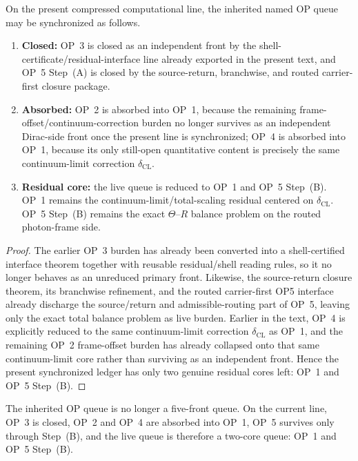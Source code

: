 \begin{proposition}
On the present compressed computational line, the inherited named OP queue may be synchronized as follows.
\begin{enumerate}[leftmargin=2em]
  \item \textbf{Closed:} OP~3 is closed as an independent front by the shell-certificate/residual-interface line already exported in the present text, and OP~5 Step~(A) is closed by the source-return, branchwise, and routed carrier-first closure package.
  \item \textbf{Absorbed:} OP~2 is absorbed into OP~1, because the remaining frame-offset/continuum-correction burden no longer survives as an independent Dirac-side front once the present line is synchronized; OP~4 is absorbed into OP~1, because its only still-open quantitative content is precisely the same continuum-limit correction \(\delta_{\mathrm{CL}}\).
  \item \textbf{Residual core:} the live queue is reduced to OP~1 and OP~5 Step~(B). OP~1 remains the continuum-limit/total-scaling residual centered on \(\delta_{\mathrm{CL}}\). OP~5 Step~(B) remains the exact \(\Theta\)--\(R\) balance problem on the routed photon-frame side.
\end{enumerate}
\end{proposition}

\begin{proof}
The earlier OP~3 burden has already been converted into a shell-certified interface theorem together with reusable residual/shell reading rules, so it no longer behaves as an unreduced primary front. Likewise, the source-return closure theorem, its branchwise refinement, and the routed carrier-first OP5 interface already discharge the source/return and admissible-routing part of OP~5, leaving only the exact total balance problem as live burden. Earlier in the text, OP~4 is explicitly reduced to the same continuum-limit correction \(\delta_{\mathrm{CL}}\) as OP~1, and the remaining OP~2 frame-offset burden has already collapsed onto that same continuum-limit core rather than surviving as an independent front. Hence the present synchronized ledger has only two genuine residual cores left: OP~1 and OP~5 Step~(B).
\end{proof}

\begin{corollary}
The inherited OP queue is no longer a five-front queue. On the current line, OP~3 is closed, OP~2 and OP~4 are absorbed into OP~1, OP~5 survives only through Step~(B), and the live queue is therefore a two-core queue: OP~1 and OP~5 Step~(B).
\end{corollary}

